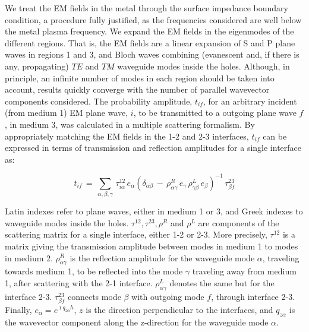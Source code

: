 We treat the EM fields in the metal through the surface impedance boundary
condition\cite{Jackson75}, a procedure fully justified, as the frequencies
considered are well below the metal
plasma frequency. We expand the EM fields
in the eigenmodes of the different regions. That is, the EM fields are a
linear expansion of S and P plane waves in regions 1 and 3, and Bloch waves
combining (evanescent and, if there is any, propagating) 
$TE$ and $TM$ waveguide modes\cite{Jackson75} inside the holes. 
Although, in principle, an infinite number of modes in each region should 
be taken into account,
results quickly converge with the number of parallel wavevector components
considered. The probability amplitude, $t_{if}$, for an arbitrary incident
(from medium 1) EM plane wave, $i$, to be transmitted to a outgoing plane
wave $f$, in medium 3, was calculated in a multiple scattering formalism. By
appropriately matching the EM fields in the 1-2 and 2-3 interfaces, $t_{if}$
can be expressed in terms of transmission and reflection amplitudes for a
single interface as:

\begin{equation}
t_{if} \, = \, \sum_{\alpha,\beta,\gamma}\,\tau^{12}_{i\alpha} \, e_{\alpha}
\left( \delta_{\alpha \beta} \, - \, \rho^{R}_{\alpha \gamma} \,
e_{\gamma}\, \rho^{L}_{\gamma \beta} \, e_{\beta} \right) ^{-1} \,
\tau^{23}_{\beta f}
\end{equation}

Latin indexes refer to plane waves, either in medium 1 or 3, and Greek
indexes to waveguide modes inside the holes. $\tau^{12}, \tau^{23}, \rho^{R} 
$ and $\rho^{L}$ are components of the scattering matrix for a
single interface, either 1-2 or 2-3. More precisely, $\tau^{12}$ is a matrix
giving the transmission amplitude between modes in medium 1 to modes in
medium 2. $\rho^{R}_{\alpha \gamma}$ is the reflection amplitude for the
waveguide mode $\alpha$, traveling towards medium 1, to be reflected into
the mode $\gamma$ traveling away from medium 1, after scattering with the
2-1 interface. $\rho^{L}_{\alpha \gamma}$ denotes the same but for the
interface 2-3. $\tau^{23}_{\beta f}$ connects mode $\beta $ with outgoing
mode $f$, through interface 2-3. Finally, $e_{\alpha} = e^{\imath
q_{z\alpha} h}$, $z$ is the direction perpendicular to the interfaces, and $%
q_{z\alpha}$ is the wavevector component along the z-direction for the
waveguide mode $\alpha$.

